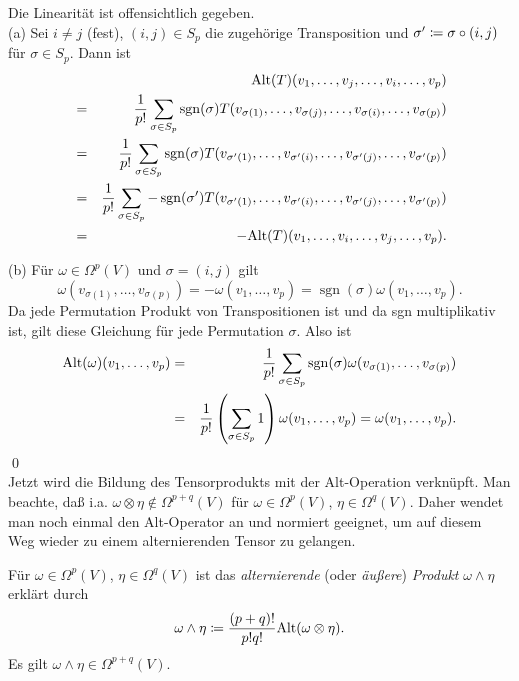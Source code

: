 \documentclass[a4paper,twoside,DIV15,BCOR12mm]{scrbook}
\DeclareMathOperator{\sgn}{sgn}
\begin{document}
\bigskip

 Die Linearität ist offensichtlich gegeben.\\

\noindent
(a) Sei $i \not= j$ (fest), $(i,j) \in S_{p}$ die zugehörige 
Transposition und $\sigma' \da  \sigma \circ (i,j)$ für $\sigma \in 
S_{p}$. Dann ist
\begin{eqnarray*} 
&   & {\rm Alt}(T) (v_{1},\dots,v_{j},\dots,v_{i},\dots,v_{p}) \\
& = & \frac{1}{p!} \sum_{\sigma \in S_{p}} \sgn (\sigma) 
T(v_{\sigma(1)},\dots,v_{\sigma(j)},\dots,v_{\sigma(i)},\dots,v_{\sigma(p)}) \\
& = & \frac{1}{p!} \sum_{\sigma \in S_{p}} \sgn (\sigma) 
T(v_{\sigma'(1)},\dots,v_{\sigma'(i)},\dots,v_{\sigma'(j)},
\dots,v_{\sigma'(p)}) \\
& = & \frac{1}{p!} \sum_{\sigma \in S_{p}} - \sgn (\sigma') 
T(v_{\sigma'(1)},\dots,v_{\sigma'(i)},
\dots,v_{\sigma'(j)},\dots,v_{\sigma'(p)}) \\
& = & -{\rm Alt}(T)(v_{1},\dots,v_{i},\dots,v_{j},\dots,v_{p}).
\end{eqnarray*}

\noindent
(b) Für $\omega \in \Omega^{p}(V)$ und $\sigma = (i,j)$ gilt
\[ \omega(v_{\sigma(1)},\dots,v_{\sigma(p)}) = 
-\omega(v_{1},\dots,v_{p}) = \sgn (\sigma) 
\omega(v_{1},\dots,v_{p}). \]
Da jede Permutation Produkt von Transpositionen ist und da sgn 
multiplikativ ist, gilt diese Gleichung für jede Permutation 
$\sigma$. Also ist
\begin{eqnarray*}
{\rm Alt}(\omega)(v_{1},\dots,v_{p}) & = & \frac{1}{p!} \sum_{\sigma 
\in S_{p}} \sgn (\sigma) 
\omega(v_{\sigma(1)},\dots,v_{\sigma(p)}) \\
& = & \frac{1}{p!} \left(\sum_{\sigma \in S_{p}} 1\right) 
\omega(v_{1},\dots,v_{p}) = \omega(v_{1},\dots,v_{p}).
\end{eqnarray*}
\qed\\

\noindent
Jetzt wird die Bildung des Tensorprodukts mit der Alt-Operation 
verknüpft. Man beachte, daß i.a. $\omega \otimes \eta \notin 
\Omega^{p+q}(V)$ für $\omega \in \Omega^{p}(V)$, $\eta \in 
\Omega^{q}(V)$. Daher wendet man noch einmal den Alt-Operator an und 
normiert geeignet, um auf diesem Weg wieder zu einem alternierenden Tensor 
zu gelangen.

\bigskip

 Für $\omega \in \Omega^{p}(V)$, $\eta 
\in \Omega^{q}(V)$ ist das {\em alternierende} (oder {\em äußere}) 
{\em Produkt} $\omega \wedge \eta$ erklärt durch
\[ \omega \wedge \eta \da  \frac{(p+q)!}{p!q!} {\rm Alt}(\omega \otimes 
\eta). \]
Es gilt $\omega \wedge \eta \in \Omega^{p+q}(V)$.\\
\end{document}
